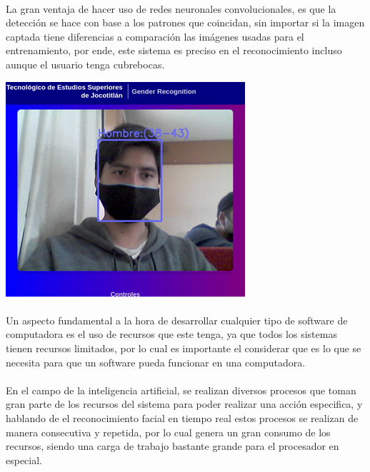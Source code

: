 \documentclass[9pt]{report}
\newenvironment{Figura}
  {\par\medskip\noindent\minipage{\linewidth}}
  {\endminipage\par\medskip}
\begin{document}
\begin{multicols}{2}
	\paragraph{}
	La gran ventaja de hacer uso de redes neuronales convolucionales, es que la detección se hace con base a los patrones que coincidan, sin importar si la imagen captada tiene diferencias a comparación las imágenes usadas para el entrenamiento, por ende, este sistema es preciso en el reconocimiento incluso aunque el usuario tenga cubrebocas. 
	\begin{Figura}
		\includegraphics[width=\textwidth]{6}
		\label{figura7}
	\end{Figura}


	\paragraph{}
	Un aspecto fundamental a la hora de desarrollar cualquier tipo de software de computadora es el uso de recursos que este tenga, ya que todos los sistemas tienen recursos limitados, por lo cual es importante el considerar que es lo que se necesita para que un software pueda funcionar en una computadora.
	\paragraph{}
	En el campo de la inteligencia artificial, se realizan diversos procesos que toman gran parte de los recursos del sistema para poder realizar una acción especifica, y hablando de el reconocimiento facial en tiempo real estos procesos se realizan de manera consecutiva y repetida, por lo cual genera un gran consumo de los recursos, siendo una carga de trabajo bastante grande para el procesador en especial.

\end{multicols}
\end{document}
